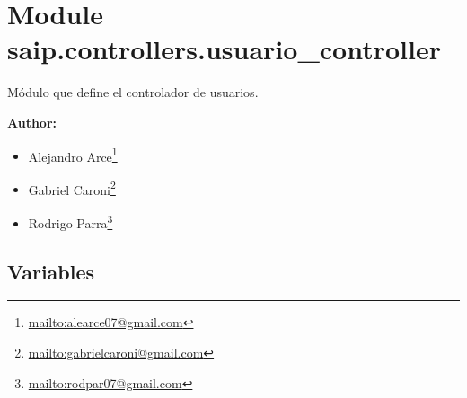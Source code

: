 %
%
%


\section{Module saip.controllers.usuario\_controller}

    \label{saip:controllers:usuario_controller}
Módulo que define el controlador de usuarios.

\textbf{Author:} \begin{itemize}
\setlength{\parskip}{0.6ex}
  \item Alejandro 
    Arce\footnote{\href{mailto:alearce07@gmail.com}{mailto:alearce07@gmail.com}}

  \item Gabriel 
    Caroni\footnote{\href{mailto:gabrielcaroni@gmail.com}{mailto:gabrielcaroni@gmail.com}}

  \item Rodrigo 
    Parra\footnote{\href{mailto:rodpar07@gmail.com}{mailto:rodpar07@gmail.com}}

\end{itemize}





  \subsection{Variables}

